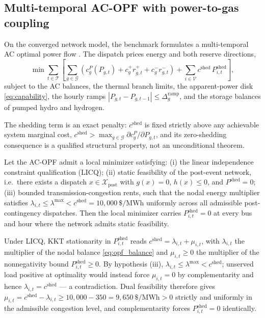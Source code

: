 \subsection{Multi-temporal AC-OPF with power-to-gas coupling}
\label{sub:opf}

On the converged network model, the benchmark formulates a multi-temporal AC optimal power flow \cite{molzahn2019}. The dispatch prices energy and both reserve directions,
\begin{equation}
\min \sum_{t \in \mathcal{T}} \left[ \sum_{g \in \mathcal{G}} \left( c_g^{P}(P_{g,t}) + c_g^{+} r_{g,t}^{+} + c_g^{-} r_{g,t}^{-} \right) + \sum_{i \in \mathcal{V}} c^{\mathrm{shed}}\, P_{i,t}^{\mathrm{shed}} \right],
\label{eq:opfobj}
\end{equation}
subject to the AC balances, the thermal branch limits, the apparent-power disk \eqref{eq:capability}, the hourly ramps $|P_{g,t} - P_{g,t-1}| \le \Delta_g^{\mathrm{ramp}}$, and the storage balances of pumped hydro and hydrogen.

The shedding term is an exact penalty: $c^{\mathrm{shed}}$ is fixed strictly above any achievable system marginal cost, $c^{\mathrm{shed}} > \max_{g \in \mathcal{G}} \partial c_g^{P} / \partial P_{g,t}$, and its zero-shedding consequence is a qualified structural property, not an unconditional theorem.

\begin{proposition}
\label{prop:shed}
Let the AC-OPF admit a local minimizer satisfying: (i) the linear independence constraint qualification (LICQ); (ii) static feasibility of the post-event network, i.e.\ there exists a dispatch $x \in \mathcal{X}_{\mathrm{post}}$ with $g(x) = 0$, $h(x) \le 0$, and $P^{\mathrm{shed}} = 0$; (iii) bounded transmission-congestion rents, such that the nodal energy multiplier satisfies $\lambda_{i,t} \le \lambda^{\max} < c^{\mathrm{shed}} = 10{,}000\ \text{\$}/\mathrm{MWh}$ uniformly across all admissible post-contingency dispatches. Then the local minimizer carries $P_{i,t}^{\mathrm{shed}} = 0$ at every bus and hour where the network admits static feasibility.
\end{proposition}

\begin{IEEEproof}
Under LICQ, KKT stationarity in $P_{i,t}^{\mathrm{shed}}$ reads $c^{\mathrm{shed}} = \lambda_{i,t} + \mu_{i,t}$, with $\lambda_{i,t}$ the multiplier of the nodal balance \eqref{eq:opf_balance} and $\mu_{i,t} \ge 0$ the multiplier of the nonnegativity bound $P_{i,t}^{\mathrm{shed}} \ge 0$. By hypothesis (iii), $\lambda_{i,t} \le \lambda^{\max} < c^{\mathrm{shed}}$; unserved load positive at optimality would instead force $\mu_{i,t} = 0$ by complementarity and hence $\lambda_{i,t} = c^{\mathrm{shed}}$ --- a contradiction. Dual feasibility therefore gives $\mu_{i,t} = c^{\mathrm{shed}} - \lambda_{i,t} \ge 10{,}000 - 350 = 9{,}650\ \text{\$}/\mathrm{MWh} > 0$ strictly and uniformly in the admissible congestion level, and complementarity forces $P_{i,t}^{\mathrm{shed}} = 0$ identically.
\end{IEEEproof}

